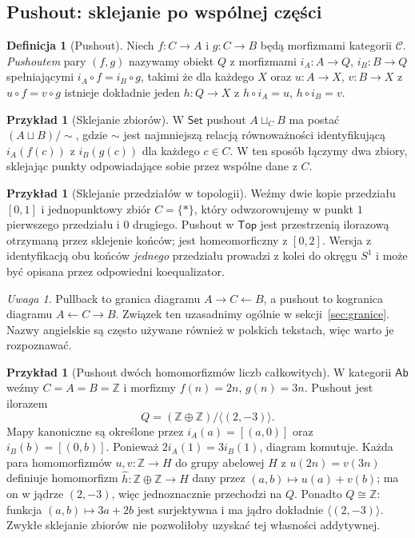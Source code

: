 \documentclass[11pt,a4paper]{article}
\numberwithin{equation}{section}
\theoremstyle{plain}
\theoremstyle{definition}
\newtheorem{definicja}[twierdzenie]{Definicja}
\newtheorem{przyklad}[twierdzenie]{Przykład}
\theoremstyle{remark}
\newtheorem{uwaga}[twierdzenie]{Uwaga}
\newcommand{\cat}[1]{\mathsf{#1}}
\newcommand{\Set}{\cat{Set}}
\newcommand{\Top}{\cat{Top}}
\newcommand{\Ab}{\cat{Ab}}
\begin{document}
\subsection{Pushout: sklejanie po wspólnej części}

\begin{definicja}[Pushout]\label{def:pushout}
Niech $f:C\to A$ i $g:C\to B$ będą morfizmami kategorii $\mathcal C$. \emph{Pushoutem} pary $(f,g)$ nazywamy obiekt $Q$ z morfizmami $i_A:A\to Q$, $i_B:B\to Q$ spełniającymi $i_A\circ f=i_B\circ g$, takimi że dla każdego $X$ oraz $u:A\to X$, $v:B\to X$ z $u\circ f=v\circ g$ istnieje dokładnie jeden $h:Q\to X$ z $h\circ i_A=u$, $h\circ i_B=v$.
\end{definicja}

\begin{przyklad}[Sklejanie zbiorów]
W $\Set$ pushout $A\sqcup_C B$ ma postać $(A\sqcup B)/{\sim}$, gdzie $\sim$ jest najmniejszą relacją równoważności identyfikującą $i_A(f(c))$ z $i_B(g(c))$ dla każdego $c\in C$. W ten sposób łączymy dwa zbiory, sklejając punkty odpowiadające sobie przez wspólne dane z $C$.
\end{przyklad}

\begin{przyklad}[Sklejanie przedziałów w topologii]
Weźmy dwie kopie przedziału $[0,1]$ i jednopunktowy zbiór $C=\{*\}$, który odwzorowujemy w punkt $1$ pierwszego przedziału i $0$ drugiego. Pushout w $\Top$ jest przestrzenią ilorazową otrzymaną przez sklejenie końców; jest homeomorficzny z $[0,2]$. Wersja z identyfikacją obu końców \emph{jednego} przedziału prowadzi z kolei do okręgu $S^1$ i może być opisana przez odpowiedni koequalizator.
\end{przyklad}

\begin{uwaga}
Pullback to granica diagramu $A\to C\leftarrow B$, a pushout to kogranica diagramu $A\leftarrow C\to B$. Związek ten uzasadnimy ogólnie w sekcji~\ref{sec:granice}. Nazwy angielskie są często używane również w polskich tekstach, więc warto je rozpoznawać.
\end{uwaga}


\begin{przyklad}[Pushout dwóch homomorfizmów liczb całkowitych]
W kategorii $\Ab$ weźmy $C=A=B=\mathbb Z$ i morfizmy $f(n)=2n$, $g(n)=3n$. Pushout jest ilorazem
\[
Q=(\mathbb Z\oplus\mathbb Z)/\langle(2,-3)\rangle.
\]
Mapy kanoniczne są określone przez $i_A(a)=[(a,0)]$ oraz $i_B(b)=[(0,b)]$. Ponieważ $2i_A(1)=3i_B(1)$, diagram komutuje. Każda para homomorfizmów $u,v:\mathbb Z\to H$ do grupy abelowej $H$ z $u(2n)=v(3n)$ definiuje homomorfizm $\widehat h:\mathbb Z\oplus\mathbb Z\to H$ dany przez $(a,b)\mapsto u(a)+v(b)$; ma on w jądrze $(2,-3)$, więc jednoznacznie przechodzi na $Q$. Ponadto $Q\cong\mathbb Z$: funkcja $(a,b)\mapsto3a+2b$ jest surjektywna i ma jądro dokładnie $\langle(2,-3)\rangle$. Zwykłe sklejanie zbiorów nie pozwoliłoby uzyskać tej własności addytywnej.
\end{przyklad}
\end{document}

